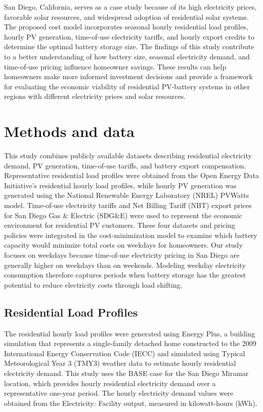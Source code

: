 \documentclass[14pt, final,numbered]{ifacconf}
\begin{document}
San Diego, California, serves as a case study because of its high electricity prices, favorable solar resources, and widespread adoption of residential solar systems. The proposed cost model incorporates seasonal hourly residential load profiles, hourly PV generation, time-of-use electricity tariffs, and hourly export credits to determine the optimal battery storage size. The findings of this study contribute to a better understanding of how battery size, seasonal electricity demand, and time-of-use pricing influence homeowner savings. These results can help homeowners make more informed investment decisions and provide a framework for evaluating the economic viability of residential PV-battery systems in other regions with different electricity prices and solar resources.

\section{Methods and data}
This study combines publicly available datasets describing residential electricity demand, PV generation, time-of-use tariffs, and battery export compensation. Representative residential load profiles were obtained from the Open Energy Data Initiative's residential hourly load profiles, while hourly PV generation was generated using the National Renewable Energy Laboratory (NREL) PVWatts model. Time-of-use electricity tariffs and Net Billing Tariff (NBT) export prices for San Diego Gas \& Electric (SDG\&E) were used to represent the economic environment for residential PV customers. These four datasets and pricing policies were integrated in the cost-minimization model to examine which battery capacity would minimize total costs on weekdays for homeowners. Our study focuses on weekdays because time-of-use electricity pricing in San Diego are generally higher on weekdays than on weekends. Modeling weekday electricity consumption therefore captures periods when battery storage has the greatest potential to reduce electricity costs through load shifting.

\subsection{Residential Load Profiles}
The residential hourly load profiles were generated using Energy Plus, a building simulation that represents a single-family detached home constructed to the 2009 International Energy Conservation Code (IECC) and simulated using Typical Meteorological Year 3 (TMY3) weather data to estimate hourly residential electricity demand. This study uses the BASE case for the San Diego Miramar location, which provides hourly residential electricity demand over a representative one-year period. The hourly electricity demand values were obtained from the Electricity: Facility output, measured in kilowatt-hours (kWh). 
\end{document}
